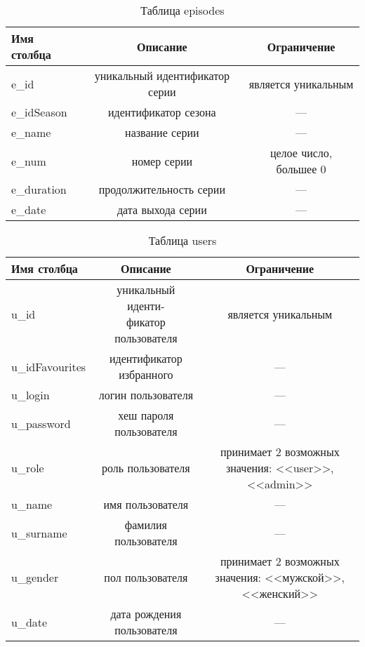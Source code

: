 \begin{table}[H]
    \begin{center}
        \caption{Таблица episodes}
        \label{tbl:episodes}
        \begin{tabular}{|l|c|c|}
            \hline
            Имя столбца & Описание & Ограничение \\ \hline
            e\_id & уникальный идентификатор серии & является уникальным \\ \hline
            e\_idSeason & идентификатор сезона & ---\\ \hline
            e\_name & название серии & ---\\ \hline
            e\_num & номер серии & целое число, большее 0\\ \hline
            e\_duration & продолжительность серии & ---\\ \hline
            e\_date & дата выхода серии & ---\\ \hline
        \end{tabular}
    \end{center}
\end{table}

\begin{table}[H]
    \begin{center}
        \caption{Таблица users}
        \label{tbl:users}
        \begin{tabular}{|l|c|c|}
            \hline
            Имя столбца & Описание & Ограничение \\ \hline
            u\_id & \makecell{уникальный иденти-\\фикатор пользователя} & является уникальным\\ \hline
            u\_idFavourites & \makecell{идентификатор\\избранного} & ---\\ \hline
            u\_login & логин пользователя & ---\\ \hline
            u\_password & \makecell{хеш пароля\\пользователя} & ---\\ \hline
            u\_role & роль пользователя & \makecell{принимает 2 возможных\\значения: <<user>>, <<admin>>}\\ \hline
            u\_name & имя пользователя & ---\\ \hline
            u\_surname & фамилия пользователя & ---\\ \hline
            u\_gender & пол пользователя & \makecell{принимает 2 возможных\\значения: <<мужской>>,\\<<женский>>}\\ \hline
            u\_date & \makecell{дата рождения\\пользователя} & ---\\ \hline
        \end{tabular}
    \end{center}
\end{table}

